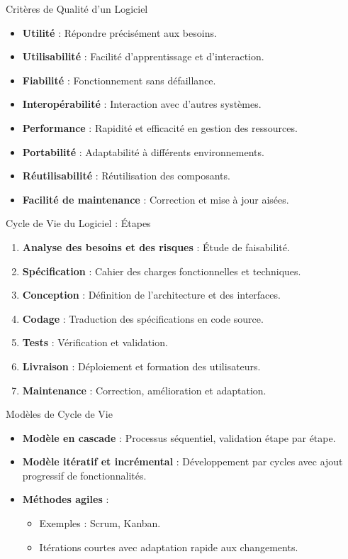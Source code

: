 \documentclass{beamer}
\begin{document}
\begin{frame}{Critères de Qualité d’un Logiciel}
    \begin{itemize}
        \item \textbf{Utilité} : Répondre précisément aux besoins.
        \item \textbf{Utilisabilité} : Facilité d'apprentissage et d'interaction.
        \item \textbf{Fiabilité} : Fonctionnement sans défaillance.
        \item \textbf{Interopérabilité} : Interaction avec d'autres systèmes.
        \item \textbf{Performance} : Rapidité et efficacité en gestion des ressources.
        \item \textbf{Portabilité} : Adaptabilité à différents environnements.
        \item \textbf{Réutilisabilité} : Réutilisation des composants.
        \item \textbf{Facilité de maintenance} : Correction et mise à jour aisées.
    \end{itemize}
\end{frame}

\begin{frame}{Cycle de Vie du Logiciel : Étapes}
    \begin{enumerate}
        \item \textbf{Analyse des besoins et des risques} : Étude de faisabilité.
        \item \textbf{Spécification} : Cahier des charges fonctionnelles et techniques.
        \item \textbf{Conception} : Définition de l'architecture et des interfaces.
        \item \textbf{Codage} : Traduction des spécifications en code source.
        \item \textbf{Tests} : Vérification et validation.
        \item \textbf{Livraison} : Déploiement et formation des utilisateurs.
        \item \textbf{Maintenance} : Correction, amélioration et adaptation.
    \end{enumerate}
\end{frame}

\begin{frame}{Modèles de Cycle de Vie}
    \begin{itemize}
        \item \textbf{Modèle en cascade} : Processus séquentiel, validation étape par étape.
        \item \textbf{Modèle itératif et incrémental} : Développement par cycles avec ajout progressif de fonctionnalités.
        \item \textbf{Méthodes agiles} :
        \begin{itemize}
            \item Exemples : Scrum, Kanban.
            \item Itérations courtes avec adaptation rapide aux changements.
        \end{itemize}
    \end{itemize}
\end{frame}
\end{document}
